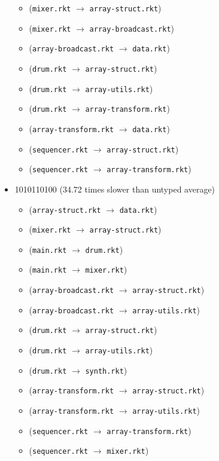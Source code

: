 \documentclass{article}
\newcommand{\mono}[1]{\texttt{#1}}
\begin{document}
\begin{itemize}
\begin{itemize}
  \item (\mono{mixer.rkt} $\rightarrow$ \mono{array-struct.rkt})
  \item (\mono{mixer.rkt} $\rightarrow$ \mono{array-broadcast.rkt})
  \item (\mono{array-broadcast.rkt} $\rightarrow$ \mono{data.rkt})
  \item (\mono{drum.rkt} $\rightarrow$ \mono{array-struct.rkt})
  \item (\mono{drum.rkt} $\rightarrow$ \mono{array-utils.rkt})
  \item (\mono{drum.rkt} $\rightarrow$ \mono{array-transform.rkt})
  \item (\mono{array-transform.rkt} $\rightarrow$ \mono{data.rkt})
  \item (\mono{sequencer.rkt} $\rightarrow$ \mono{array-struct.rkt})
  \item (\mono{sequencer.rkt} $\rightarrow$ \mono{array-transform.rkt})
  \end{itemize}
\item 1010110100 (34.72 times slower than untyped average)
  \begin{itemize}
  \item (\mono{array-struct.rkt} $\rightarrow$ \mono{data.rkt})
  \item (\mono{mixer.rkt} $\rightarrow$ \mono{array-struct.rkt})
  \item (\mono{main.rkt} $\rightarrow$ \mono{drum.rkt})
  \item (\mono{main.rkt} $\rightarrow$ \mono{mixer.rkt})
  \item (\mono{array-broadcast.rkt} $\rightarrow$ \mono{array-struct.rkt})
  \item (\mono{array-broadcast.rkt} $\rightarrow$ \mono{array-utils.rkt})
  \item (\mono{drum.rkt} $\rightarrow$ \mono{array-struct.rkt})
  \item (\mono{drum.rkt} $\rightarrow$ \mono{array-utils.rkt})
  \item (\mono{drum.rkt} $\rightarrow$ \mono{synth.rkt})
  \item (\mono{array-transform.rkt} $\rightarrow$ \mono{array-struct.rkt})
  \item (\mono{array-transform.rkt} $\rightarrow$ \mono{array-utils.rkt})
  \item (\mono{sequencer.rkt} $\rightarrow$ \mono{array-transform.rkt})
  \item (\mono{sequencer.rkt} $\rightarrow$ \mono{mixer.rkt})
  \end{itemize}

\end{itemize}
\end{document}
